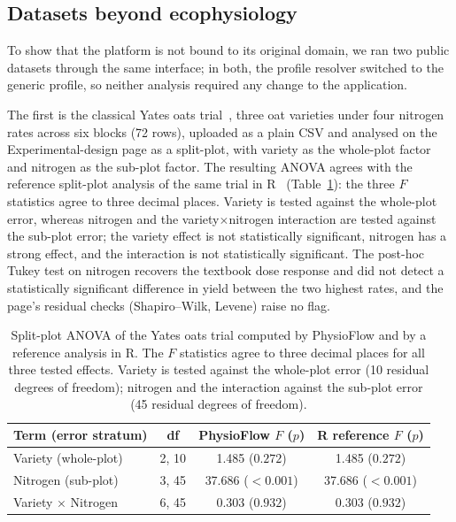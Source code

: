 \documentclass[11pt, letterpaper]{article}
\begin{document}
\subsection{Datasets beyond ecophysiology}\label{sec:ex-generic}

To show that the platform is not bound to its original domain, we ran two public datasets through the same interface; in both, the profile resolver switched to the generic profile, so neither analysis required any change to the application.

The first is the classical Yates oats trial~\cite{Yates1935}, three oat varieties under four nitrogen rates across six blocks (72 rows), uploaded as a plain CSV and analysed on the Experimental-design page as a split-plot, with variety as the whole-plot factor and nitrogen as the sub-plot factor. The resulting ANOVA agrees with the reference split-plot analysis of the same trial in R~\cite{Pinheiro2000} (Table~\ref{tbl:oats}): the three $F$ statistics agree to three decimal places. Variety is tested against the whole-plot error, whereas nitrogen and the variety$\times$nitrogen interaction are tested against the sub-plot error; the variety effect is not statistically significant, nitrogen has a strong effect, and the interaction is not statistically significant. The post-hoc Tukey test on nitrogen recovers the textbook dose response and did not detect a statistically significant difference in yield between the two highest rates, and the page's residual checks (Shapiro--Wilk, Levene) raise no flag.

\begin{table}[htbp]
\centering
\footnotesize
\begin{tabular}{lccc}
\toprule
\textbf{Term (error stratum)} & \textbf{df} & \textbf{PhysioFlow $F$ ($p$)} & \textbf{R reference $F$ ($p$)} \\
\midrule
Variety (whole-plot)      & 2, 10 & 1.485 ($0.272$)        & 1.485 ($0.272$) \\
Nitrogen (sub-plot)       & 3, 45 & 37.686 ($<0.001$)      & 37.686 ($<0.001$) \\
Variety $\times$ Nitrogen & 6, 45 & 0.303 ($0.932$)        & 0.303 ($0.932$) \\
\bottomrule
\end{tabular}
\caption{Split-plot ANOVA of the Yates oats trial computed by PhysioFlow and by a reference analysis in R. The $F$ statistics agree to three decimal places for all three tested effects. Variety is tested against the whole-plot error (10 residual degrees of freedom); nitrogen and the interaction against the sub-plot error (45 residual degrees of freedom).}\label{tbl:oats}
\end{table}
\end{document}
